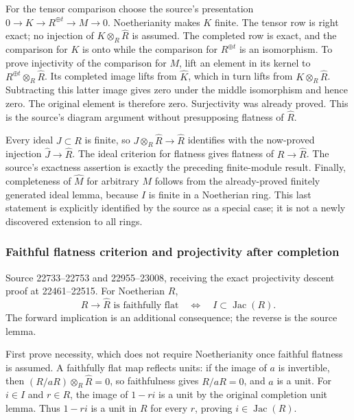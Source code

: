 For the tensor comparison choose the source's presentation \(0\to K\to R^{\oplus t}\to M\to0\). Noetherianity makes \(K\) finite. The tensor row is right exact; no injection of \(K\otimes_R\widehat R\) is assumed. The completed row is exact, and the comparison for \(K\) is onto while the comparison for \(R^{\oplus t}\) is an isomorphism. To prove injectivity of the comparison for \(M\), lift an element in its kernel to \(R^{\oplus t}\otimes_R\widehat R\). Its completed image lifts from \(\widehat K\), which in turn lifts from \(K\otimes_R\widehat R\). Subtracting this latter image gives zero under the middle isomorphism and hence zero. The original element is therefore zero. Surjectivity was already proved. This is the source's diagram argument without presupposing flatness of \(\widehat R\).

Every ideal \(J\subset R\) is finite, so \(J\otimes_R\widehat R\to\widehat R\) identifies with the now-proved injection \(\widehat J\to\widehat R\). The ideal criterion for flatness gives flatness of \(R\to\widehat R\). The source's exactness assertion is exactly the preceding finite-module result. Finally, completeness of \(\widehat M\) for arbitrary \(M\) follows from the already-proved finitely generated ideal lemma, because \(I\) is finite in a Noetherian ring. This last statement is explicitly identified by the source as a special case; it is not a newly discovered extension to all rings.

\subsubsection{Faithful flatness criterion and projectivity after completion}\label{algebra-proof-014-faithful-flatness-criterion-and-projectivity-after-completion}

Source 22733--22753 and 22955--23008, receiving the exact projectivity descent proof at 22461--22515. For Noetherian \(R\), \[
R\longrightarrow\widehat R\text{ is faithfully flat}
\quad\Longleftrightarrow\quad I\subset\operatorname{Jac}(R).
\] The forward implication is an additional consequence; the reverse is the source lemma.

First prove necessity, which does not require Noetherianity once faithful flatness is assumed. A faithfully flat map reflects units: if the image of \(a\) is invertible, then \((R/aR)\otimes_R\widehat R=0\), so faithfulness gives \(R/aR=0\), and \(a\) is a unit. For \(i\in I\) and \(r\in R\), the image of \(1-ri\) is a unit by the original completion unit lemma. Thus \(1-ri\) is a unit in \(R\) for every \(r\), proving \(i\in\operatorname{Jac}(R)\).

